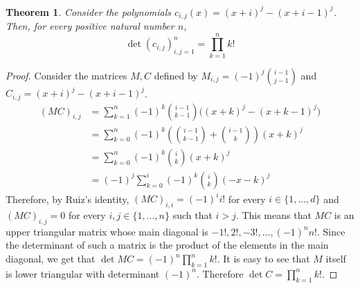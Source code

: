 \documentclass[12pt]{article}
\newtheorem*{thm}{Theorem}
\begin{document}
\begin{thm}
Consider the polynomials $c_{i,j}(x)=(x+i)^{j}-(x+i-1)^{j}$. Then, for every positive natural number $n$,
\[ \det (c_{i,j})_{i,j=1}^n = \prod_{k=1}^{n} k! \]
\end{thm}
\begin{proof}
Consider the matrices $M,C$ defined by $M_{i,j}=(-1)^j{i-1 \choose j-1}$ and $C_{i,j}=(x+i)^j-(x+i-1)^j$.
\[\begin{aligned}
(MC)_{i,j}&=\sum_{k=1}^n (-1)^k {i-1 \choose k-1}\bigl((x+k)^j-(x+k-1)^j\bigr) \\
          &=\sum_{k=0}^n (-1)^k \left({i-1 \choose k-1}+{i-1 \choose k}\right)(x+k)^j \\
          &=\sum_{k=0}^n (-1)^k {i \choose k}(x+k)^j \\
          &=(-1)^j\sum_{k=0}^i (-1)^{k} {i \choose k}(-x-k)^j
\end{aligned}\]
Therefore, by Ruiz's identity, $(MC)_{i,i}=(-1)^i i!$ for every $i \in \{1,...,d\}$ and $(MC)_{i,j}=0$ for every $i,j \in \{1,...,n\}$ such that $i>j$. This
means that $MC$ is an upper triangular matrix whose main diagonal is $-1!,2!,-3!,...,(-1)^n n!$. Since the determinant of such a matrix is
the product of the elements in the main diagonal, we get that $\det MC=(-1)^{n} \prod_{k=1}^{n}k!$. It is easy to see that $M$ itself is lower
triangular with determinant $(-1)^n$. Therefore $\det C=\prod_{k=1}^{n}k!$.
\end{proof}
\end{document}
